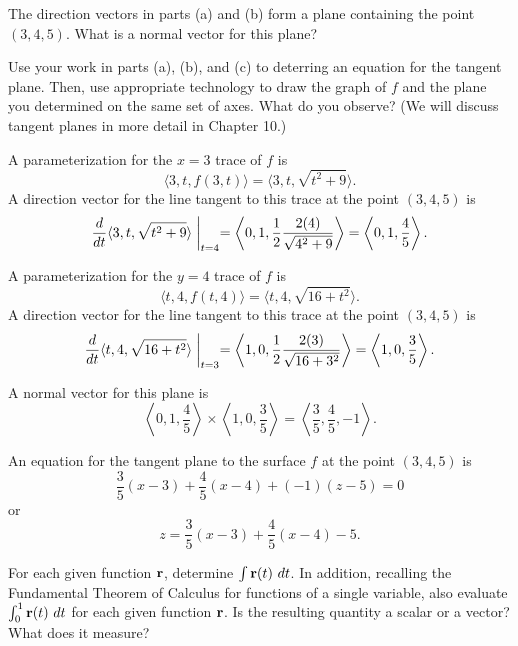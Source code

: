 \begin{exercises}
    \item The direction vectors in parts (a) and (b) form a plane containing the point $(3,4,5)$. What is a normal vector for this plane? 
    
    \item Use your work in parts (a), (b), and (c) to deterring an equation for the tangent plane.  Then, use appropriate technology to draw the graph of $f$ and the plane you determined on the same set of axes. What do you observe? (We will discuss tangent planes in more detail in Chapter 10.)

    \ea
\begin{exerciseSolution}
    \ba
    \item A parameterization for the $x=3$ trace of $f$ is
\[\langle 3, t, f(3,t) \rangle = \langle 3,t, \sqrt{t^2+9} \rangle.\]
A direction vector for the line tangent to this trace at the point $(3,4,5)$ is 
\[\frac{d}{dt}\langle 3,t, \sqrt{t^2+9} \rangle\biggm|_{t=4} = \left\langle 0, 1, \frac{1}{2}\frac{2(4)}{\sqrt{4^2+9}} \right\rangle = \left\langle 0, 1, \frac{4}{5} \right\rangle.\]

    \item A parameterization for the $y=4$ trace of $f$ is
\[\langle t, 4, f(t,4) \rangle = \langle t,4, \sqrt{16+t^2} \rangle.\]
A direction vector for the line tangent to this trace at the point $(3,4,5)$ is 
\[\frac{d}{dt}\langle t,4, \sqrt{16+t^2} \rangle\biggm|_{t=3} = \left\langle 1, 0, \frac{1}{2}\frac{2(3)}{\sqrt{16+3^2}} \right\rangle = \left\langle 1, 0, \frac{3}{5} \right\rangle.\]

    \item A normal vector for this plane is 
\[\left\langle 0, 1, \frac{4}{5} \right\rangle \times \left\langle 1, 0, \frac{3}{5} \right\rangle = \left\langle \frac{3}{5}, \frac{4}{5}, -1 \right\rangle.\]
    
    \item An equation for the tangent plane to the surface $f$ at the point $(3,4,5)$ is 
\[\frac{3}{5}(x-3) + \frac{4}{5}(x-4) + (-1)(z-5) = 0\]
or
\[z=\frac{3}{5}(x-3) + \frac{4}{5}(x-4) - 5.\]


    \ea
\end{exerciseSolution}


\item \label{Ez:9.7.4}   For each given function $\mathbf{r}$, determine $\int \mathbf{r}(t) \ dt$.  In addition, recalling the Fundamental Theorem of Calculus for functions of a single variable, also evaluate $\int_0^1 \mathbf{r}(t) \ dt$ for each given function $\mathbf{r}$.  Is the resulting quantity a scalar or a vector?  What does it measure?



\end{exercises}
